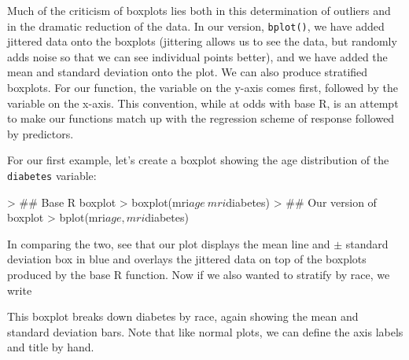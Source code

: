 \documentclass[landscape]{article}
\renewenvironment{Schunk}{\vspace{\topsep}}{\vspace{\topsep}}
\begin{document}
Much of the criticism of boxplots lies both in this determination of outliers and in the dramatic reduction of the data. In our version, \texttt{bplot()}, we have added jittered data onto the boxplots (jittering allows us to see the data, but randomly adds noise so that we can see individual points better), and we have added the mean and standard deviation onto the plot. We can also produce stratified boxplots. For our function, the variable on the y-axis comes first, followed by the variable on the x-axis. This convention, while at odds with base R, is an attempt to make our functions match up with the regression scheme of response followed by predictors.

For our first example, let's create a boxplot showing the age distribution of the \texttt{diabetes} variable:
\begin{Schunk}
\begin{Sinput}
> ## Base R boxplot
> boxplot(mri$age ~ mri$diabetes)
> ## Our version of boxplot
> bplot(mri$age, mri$diabetes)
\end{Sinput}
\end{Schunk}
In comparing the two, see that our plot displays the mean line and $\pm$ standard deviation box in blue and overlays the jittered data on top of the boxplots produced by the base R function. Now if we also wanted to stratify by race, we write
\begin{Schunk}
\end{Schunk}
This boxplot breaks down diabetes by race, again showing the mean and standard deviation bars. Note that like normal plots, we can define the axis labels and title by hand.
\end{document}
